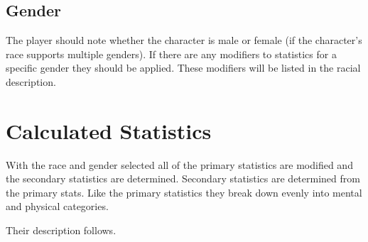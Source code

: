 \subsection{Gender}

The player should note whether the character is male or
female (if the character's race supports multiple genders). If there are
any modifiers to statistics for a specific gender they should be applied.
These modifiers will be listed in the racial description.

\section{Calculated Statistics}

With the race and gender selected all of the primary statistics are modified 
and the secondary statistics are determined. Secondary statistics are 
determined from the primary stats. Like the primary statistics they break 
down evenly into mental and physical categories.

Their description follows.

